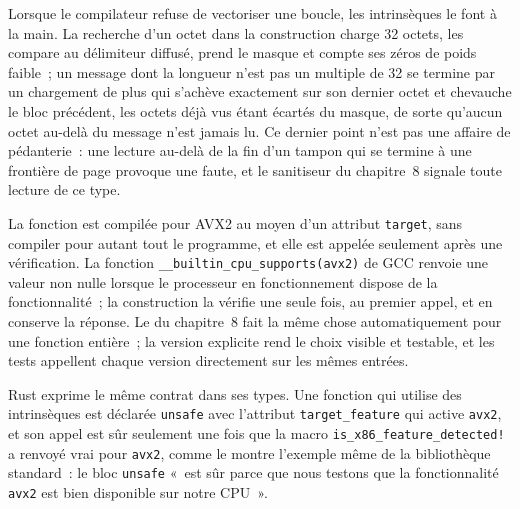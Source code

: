 Lorsque le compilateur refuse de vectoriser une boucle, les intrinsèques le font à la main. La recherche d'un octet dans la construction charge 32 octets,
les compare au délimiteur diffusé, prend le masque et compte ses zéros de poids faible~; un message dont la longueur n'est pas un multiple de
32 se termine par un chargement de plus qui s'achève exactement sur son dernier octet et chevauche le bloc précédent, les octets déjà
vus étant écartés du masque, de sorte qu'aucun octet au-delà du message n'est jamais lu. Ce dernier point n'est pas une affaire de pédanterie~: une lecture au-delà
de la fin d'un tampon qui se termine à une frontière de page provoque une faute, et le sanitiseur du chapitre~8 signale toute lecture de ce type.

\label{lst:ll:vector-instructions-and-data-parallel-code:find}

\begin{sloppypar}La fonction est compilée pour AVX2 au moyen d'un attribut \texttt{target}, sans compiler pour autant tout le programme, et elle est appelée
seulement après une vérification. La fonction \texttt{\_\_builtin\_cpu\_supports(\textquotedbl{}avx2\textquotedbl{})} de GCC renvoie une valeur non nulle lorsque le processeur en fonctionnement
dispose de la fonctionnalité~; la construction la vérifie une seule fois, au premier appel, et en conserve la réponse. Le  du chapitre~8 fait la même chose
automatiquement pour une fonction entière~; la version explicite rend le choix visible et testable, et les tests appellent chaque
version directement sur les mêmes entrées.\end{sloppypar}

\label{lst:ll:vector-instructions-and-data-parallel-code:dispatch}

Rust exprime le même contrat dans ses types. Une fonction qui utilise des intrinsèques est déclarée \texttt{unsafe} avec l'attribut \texttt{target\_feature} qui active \texttt{avx2}, et son appel est sûr
seulement une fois que la macro \texttt{is\_x86\_feature\_detected!} a renvoyé vrai pour \texttt{avx2}, comme le montre l'exemple même de la bibliothèque standard~: le
bloc \texttt{unsafe} «~est sûr parce que nous testons que la fonctionnalité \texttt{avx2} est bien disponible sur notre CPU~».


